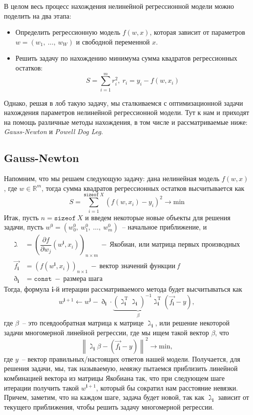 \documentclass[12pt, a4paper, oneside, final]{article}
\begin{document}
	В целом весь процесс нахождения нелинейной регрессионной модели можно поделить на два этапа:
	\begin{itemize}
		\item Определить регрессионную модель $f(w, x)$, которая зависит от параметров $w = (w_{1}, ~ \ldots, ~ w_{W})$ и свободной переменной $x$.
		\item Решить задачу по нахождению минимума сумма квадратов регрессионных остатков:
		\[
			S = \sum\limits_{i = 1}^{m}{r_{i}^{2}}, ~ r_{i} = y_{i} - f(w, x_{i})
		\]
	\end{itemize}
	Однако, решая в лоб такую задачу, мы сталкиваемся с оптимизационной задачи нахождения параметров нелинейной регрессионной модели.
	Тут к нам и приходят на помощь различные методы нахождения, в том числе и рассматриваемые ниже: \textit{Gauss-Newton} и \textit{Powell Dog Leg}.
	\subsection*{Gauss-Newton}
	Напомним, что мы решаем следующую задачу: дана нелинейная модель $f(w, x)$, где $w \in \mathbb{R}^{m}$, тогда сумма квадратов регрессионных остатков высчитывается как
	\[
		S = \sum\limits_{i = 1}^{\texttt{sizeof}~X}{(f(w, x_{i}) - y_{i})^2} \to \mathrm{min}
	\]
	Итак, пусть $n = \texttt{sizeof}~X$ и введем некоторые новые объекты для решения задачи, пусть $w^{0} = (w_{0}^{0}, ~ w_{1}^{0}, ~ \ldots, ~ w^{0}_{m})$~-- начальное приближение, и
	\begin{align*}
		\gimel &= \left(\dfrac{\partial{f}}{\partial{w_{j}}}{(w^{\mathbf{i}}, x_{i})}\right)_{n \times m}~-~\text{Якобиан, или матрица первых производных} \\
		\vec{f_{\mathbf{i}}} &= \left(f(w^{\mathbf{i}}, x_{i})\right)_{n \times 1}~-~\text{вектор значений функции}~f \\
		\eth_{\mathbf{i}} &= \texttt{const}~-~\text{размера шага}
	\end{align*}
	Тогда, формула $\mathbf{i}$-й итерации рассматриваемого метода будет высчитываться как
	\[
		w^{\mathbf{i} + 1} \gets w^{\mathbf{i}} - \eth_{\mathbf{i}} \cdot \underbrace{\left(\gimel^{\mathrm{T}}_{\mathbf{i}}\gimel_{\mathbf{i}}\right)^{-1}\gimel_{\mathbf{i}}^{\mathrm{T}}}_{\beta}(\vec{f_{\mathbf{i}}} - y),
	\] где $\beta$~-- это псевдообратная матрица к матрице $\gimel_{\mathbf{i}}$, или решение некоторой задачи многомерной линейной регрессии, где мы ищем такой вектор $\beta$, что
	\[
		\left\|\gimel_{\mathbf{i}}\beta - (\vec{f_{\mathbf{i}}} - y)\right\|^{2} \to \mathrm{min},
	\] где $y$~-- вектор правильных/настоящих ответов нашей модели.
	Получается, для решения задачи, мы, так называемую, \textit{невязку} пытаемся приблизить линейной комбинацией вектора из матрицы Якобиана так, что при следующем шаге итерации получить такой $w^{\mathbf{i} + 1}$, который бы сократил нам расстояние невязки.
	Причем, заметим, что на каждом шаге, задача будет новой, так как $\gimel_{\mathbf{i}}$ зависит от текущего приближения, чтобы решить задачу многомерной регрессии.
\end{document}

